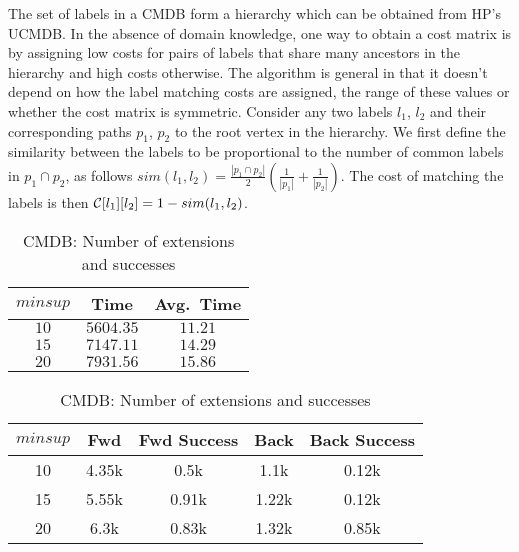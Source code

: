 \smallskip{} The set of labels in a CMDB
form a hierarchy which can be obtained from HP's UCMDB. In the absence
of domain knowledge, one way to obtain a cost matrix is by assigning low
costs for pairs of labels that share many ancestors in the hierarchy and
high costs otherwise. The algorithm is general in that it doesn't depend
on how the label matching costs are assigned, the range of these values
or whether the cost matrix is symmetric.  Consider any two labels $l_1$,
$l_2$ and their corresponding paths $p_1$, $p_2$ to the root vertex in
the hierarchy.  We first define the similarity between the labels to be
proportional to the number of common labels in $p_1 \cap p_2$, as
follows
$sim(l_1,l_2) =  \frac{|p_1 \cap p_2|}{2}
  \left(\frac{1}{|p_1|} + \frac{1}{|p_2|}\right)$.
The cost of matching the labels is then 
${\mathcal{C}}[l_1][l_2] = 1 - sim(l_1,l_2)$.

\begin{table}[!h]
\centering
\begin{tabular}{|c|c|c|}
        \hline
        $minsup$ & Time & Avg.\ Time \\
		\hline
        $10$ & $5604.35$ & $11.21$\\
        $15$ & $7147.11$ & $14.29$\\
        $20$ & $7931.56$ & $15.86$\\
		\hline
    \end{tabular}
\vspace{-0.1in}
    \caption{CMDB: Time (sec) for random walks}
\label{tab:ge}
	\vspace{0.1in}
    \centering
    \begin{tabular}{|c|c|c|c|c|}
        \hline
        $minsup$ & Fwd & Fwd Success & Back & Back Success \\
        \hline
10	&4.35k	&	0.5k &   	1.1k &   	0.12k\\
15	&5.55k	&	0.91k&		1.22k&		0.12k\\
20	&6.3k	&	0.83k&		1.32k&		0.85k\\		
        \hline
    \end{tabular}
	\vspace{-0.1in}
    \caption{CMDB: Number of extensions and successes}
    \label{tab:cmdb_ext}
\end{table}


